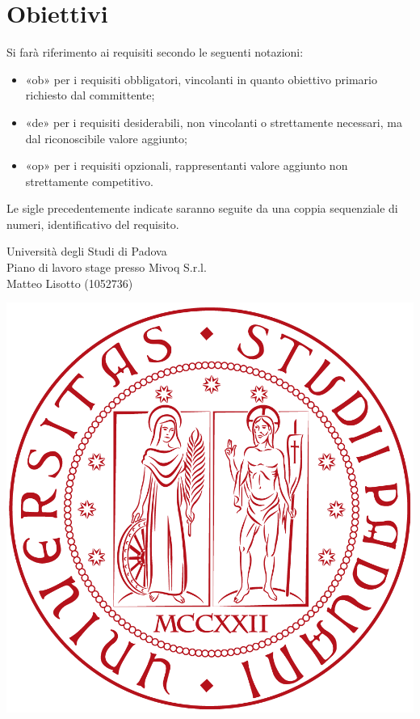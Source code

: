 \documentclass[11pt,notitlepage]{article}
\begin{document}
\section*{Obiettivi}

Si farà riferimento ai requisiti secondo le seguenti notazioni:
\begin{itemize}
	\item «ob» per i requisiti obbligatori, vincolanti in quanto obiettivo primario
	richiesto dal committente;
	\item  «de» per i requisiti desiderabili, non vincolanti o strettamente necessari,
	ma dal riconoscibile valore aggiunto;
	\item «op» per i requisiti opzionali, rappresentanti valore aggiunto non
	strettamente competitivo.
\end{itemize}
Le sigle precedentemente indicate saranno seguite da una coppia sequenziale di numeri, identificativo del requisito.\\

\newpage

\noindent
\parbox{0.7\columnwidth}{Università degli Studi di Padova\\
	Piano di lavoro stage presso Mivoq S.r.l.\\
        Matteo Lisotto (1052736)}
\parbox{0.3\columnwidth}{
	\hfill \includegraphics[scale=0.08]{immagini/logo-unipd.png}}
\end{document}
